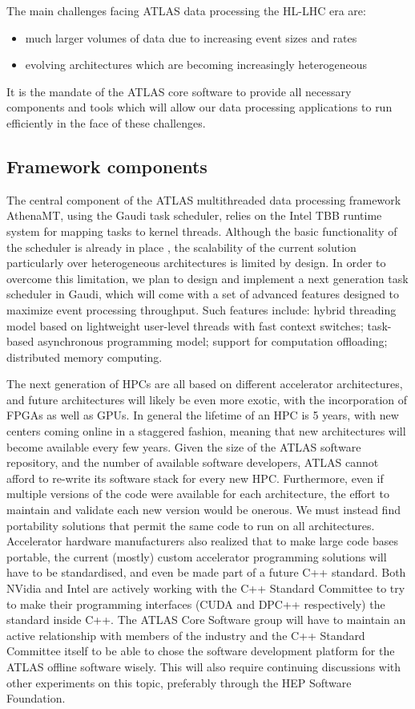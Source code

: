 
The main challenges facing ATLAS data processing the HL-LHC era are:
\begin{itemize}
\item much larger volumes of data due to increasing event sizes and rates
\item evolving architectures which are becoming increasingly heterogeneous
\end{itemize}
It is the mandate of the ATLAS core software to provide all necessary components and tools which will allow our data processing applications to run efficiently in the face of these challenges.


\subsection{Framework components}

The central component of the ATLAS multithreaded data processing framework AthenaMT, using the Gaudi task scheduler, relies on the Intel TBB runtime system for mapping tasks to kernel threads. Although the basic functionality of the scheduler is already in place \cite{ishap:2015, ishap:2016}, the scalability of the current solution particularly over heterogeneous architectures is limited by design. In order to overcome this limitation, we plan to design and implement a next generation task scheduler in Gaudi, which will come with a set of advanced features designed to maximize event processing throughput. Such features include: hybrid threading model based on lightweight user-level threads with fast context switches; task-based asynchronous programming model; support for computation offloading; distributed memory computing.

The next generation of HPCs are all based on different accelerator architectures, and future architectures will likely be even more exotic, with the incorporation of FPGAs as well as GPUs. In general the lifetime of an HPC is 5 years, with new centers coming online in a staggered fashion, meaning that new architectures will become available every few years. Given the size of the ATLAS software repository, and the number of available software developers, ATLAS cannot afford to re-write its software stack for every new HPC. Furthermore, even if multiple versions of the code were available for each architecture, the effort to maintain and validate each new version would be onerous. We must instead find portability solutions that permit the same code to run on all architectures. Accelerator hardware manufacturers also realized that to make large code bases portable, the current (mostly) custom accelerator programming solutions will have to be standardised, and even be made part of a future C++ standard. Both NVidia and Intel are actively working with the C++ Standard Committee to try to make their programming interfaces (CUDA and DPC++ respectively) the standard inside C++. The ATLAS Core Software group will have to maintain an active relationship with members of the industry and the C++ Standard Committee itself to be able to chose the software development platform for the ATLAS offline software wisely. This will also require continuing discussions with other experiments on this topic, preferably through the HEP Software Foundation.

